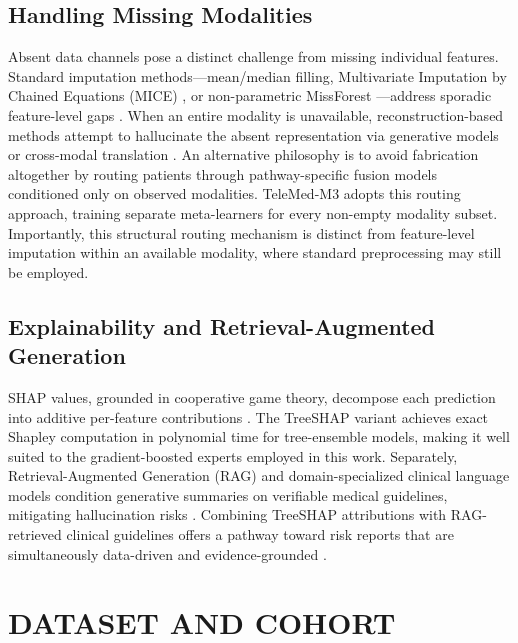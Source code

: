 \documentclass[10pt,twocolumn,letterpaper]{article}
\begin{document}
\subsection{Handling Missing Modalities}
Absent data channels pose a distinct challenge from missing individual features. Standard imputation methods---mean/median filling, Multivariate Imputation by Chained Equations (MICE) \citep{vanbuuren2011mice}, or non-parametric MissForest \citep{stekhoven2012missforest}---address sporadic feature-level gaps \citep{rubin1976inference}. When an entire modality is unavailable, reconstruction-based methods attempt to hallucinate the absent representation via generative models or cross-modal translation \citep{ma2021smil}. An alternative philosophy is to avoid fabrication altogether by routing patients through pathway-specific fusion models conditioned only on observed modalities. TeleMed-M3 adopts this routing approach, training separate meta-learners for every non-empty modality subset. Importantly, this structural routing mechanism is distinct from feature-level imputation within an available modality, where standard preprocessing may still be employed.

\subsection{Explainability and Retrieval-Augmented Generation}
SHAP values, grounded in cooperative game theory, decompose each prediction into additive per-feature contributions \citep{lundberg2017unified, lundberg2020nature}. The TreeSHAP variant achieves exact Shapley computation in polynomial time for tree-ensemble models, making it well suited to the gradient-boosted experts employed in this work. Separately, Retrieval-Augmented Generation (RAG) and domain-specialized clinical language models condition generative summaries on verifiable medical guidelines, mitigating hallucination risks \citep{lewis2020retrieval, singhal2023large, thirunavukarasu2023large}. Combining TreeSHAP attributions with RAG-retrieved clinical guidelines offers a pathway toward risk reports that are simultaneously data-driven and evidence-grounded \citep{esteva2019guide}.

\section{DATASET AND COHORT}
\end{document}
